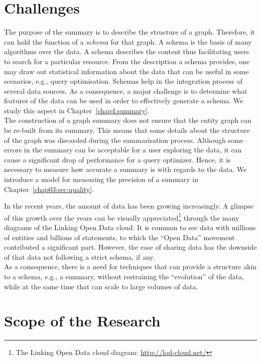 \section{Challenges}

The purpose of the summary is to describe the structure of a graph. Therefore, it can hold the function of a \emph{schema} for that graph.
A schema is the basis of many algorithms over the data. A schema describes the content thus facilitating users to search for a particular resource. From the description a schema provides, one may draw out statistical information about the data that can be useful in some scenarios, e.g., query optimisation. Schemas help in the integration process of several data sources. As a consequence, a major challenge is to determine what features of the data can be used in order to effectively generate a schema. We study this aspect in Chapter~\ref{chap4:summary}.\\

The construction of a graph summary does not ensure that the entity graph can be re-built from its summary. This means that some details about the structure of the graph was discarded during the summarisation process. Although some errors in the summary can be acceptable for a user exploring the data, it can cause a significant drop of performance for a query optimizer. Hence, it is necessary to measure how accurate a summary is with regards to the data. We introduce a model for measuring the precision of a summary in Chapter~\ref{chap03:sec:quality}.

In the recent years, the amount of data has been growing increasingly. A glimpse of this growth over the years can be visually appreciated\footnote{The Linking Open Data cloud diagram: \url{http://lod-cloud.net/}} through the many diagrams of the Linking Open Data cloud. It is common to see data with millions of entities and billions of statements, to which the ``Open Data'' movement contributed a significant part. However, the ease of sharing data has the downside of that data not following a strict schema, if any.\\

As a consequence, there is a need for techniques that can provide a structure akin to a schema, e.g., a summary, without restraining the ``evolution'' of the data, while at the same time that can scale to large volumes of data.

\section{Scope of the Research}

